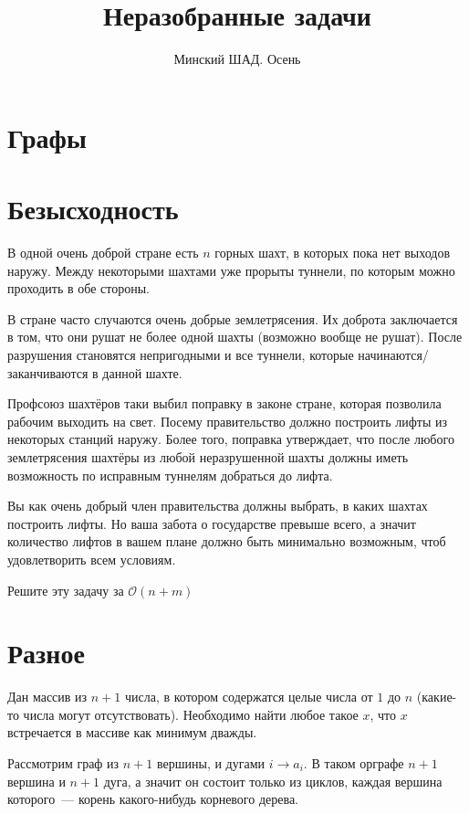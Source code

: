 \documentclass[addpoints]{exam}
\title{Неразобранные задачи}
\author{Минский ШАД. Осень}
\begin{document}
\maketitle

\begin{questions}

\section{Графы}

\section{Безысходность}

В одной очень доброй стране есть $n$ горных шахт, в которых пока нет выходов наружу. Между некоторыми шахтами уже прорыты туннели, по которым можно проходить в обе стороны.

В стране часто случаются очень добрые землетрясения. Их доброта заключается в том, что они рушат не более одной шахты (возможно вообще не рушат). После разрушения становятся непригодными и все туннели, которые начинаются/заканчиваются в данной шахте.

Профсоюз шахтёров таки выбил поправку в законе стране, которая позволила рабочим выходить на свет. Посему правительство должно построить лифты из некоторых станций наружу. Более того, поправка утверждает, что после любого землетрясения шахтёры из любой неразрушенной шахты должны иметь возможность по исправным туннелям добраться до лифта.

Вы как очень добрый член правительства должны выбрать, в каких шахтах построить лифты. Но ваша забота о государстве превыше всего, а значит количество лифтов в вашем плане должно быть минимально возможным, чтоб удовлетворить всем условиям.

Решите эту задачу за $\mathcal{O}(n + m)$

\section{Разное}

\question[3] Дан массив из $n+1$ числа, в котором содержатся целые числа от $1$ до $n$ (какие-то числа могут отсутствовать). Необходимо найти любое такое $x$, что $x$ встречается в массиве как минимум дважды.

\begin{solution}

Рассмотрим граф из $n+1$ вершины, и дугами $i \rightarrow a_i$. В таком орграфе $n+1$ вершина и $n+1$ дуга, а значит он состоит только из циклов, каждая вершина которого~--- корень какого-нибудь корневого дерева.


\end{solution}
\end{questions}
\end{document}
